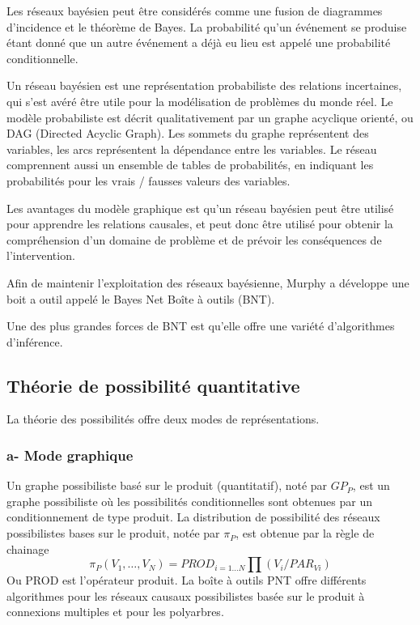 Les réseaux bayésien peut être considérés comme une fusion de diagrammes d'incidence et le théorème de Bayes. La probabilité qu'un événement se produise étant donné que un autre événement a déjà eu lieu est appelé une probabilité conditionnelle. 

Un réseau bayésien est une représentation probabiliste des relations incertaines, qui s'est avéré être utile pour la modélisation de problèmes du monde réel. Le modèle probabiliste est décrit qualitativement par un graphe acyclique orienté, ou DAG (Directed Acyclic Graph). Les sommets du graphe représentent des variables, les arcs représentent la dépendance entre les variables. Le réseau comprennent aussi un ensemble de tables de probabilités, en indiquant les probabilités pour les vrais / fausses valeurs des variables.

Les avantages du  modèle graphique est qu’un réseau bayésien peut être utilisé pour apprendre les relations causales, et peut donc être utilisé pour obtenir la compréhension d'un domaine de problème et de prévoir les conséquences de l'intervention.

Afin de maintenir l'exploitation des réseaux bayésienne, Murphy a développe une boit a outil appelé le Bayes Net Boîte à outils (BNT).

Une des plus grandes forces de BNT \cite{BNT} est qu'elle offre une variété d'algorithmes d'inférence.


\subsection{Théorie de possibilité quantitative}

La théorie des possibilités offre deux modes de représentations.

\subsubsection{a- Mode graphique}

Un graphe possibiliste basé sur le produit (quantitatif), noté par $GP_{P}$, est un graphe possibiliste où les possibilités conditionnelles sont obtenues par un conditionnement de type produit. La distribution de possibilité des réseaux possibilistes bases sur le produit, notée par $\pi_{P}$, est obtenue par la règle de chainage 
\begin{equation}
\pi_{P} (V_1, \dots , V_N) = PROD_{i=1 \dots N} \prod  (V_i/PAR_{Vi})
\end{equation}
Ou PROD est l’opérateur produit\cite{BoBrDu2008.1}.
La boîte à outils PNT offre  différents algorithmes pour les réseaux causaux possibilistes basée sur le produit à connexions multiples et pour les polyarbres. 
